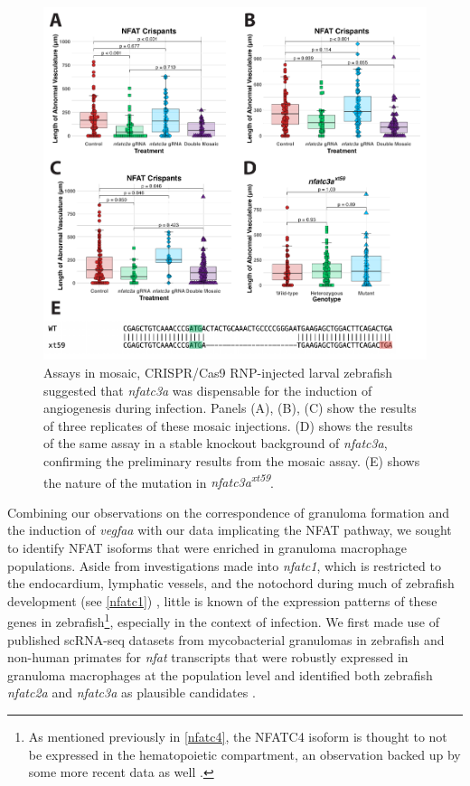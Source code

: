 \begin{figure}
\centering
\includegraphics[width=\textwidth]{images/mosaicnfatc3a.pdf}
\caption{Assays in mosaic, CRISPR/Cas9 RNP-injected larval zebrafish suggested that \textit{nfatc3a} was dispensable for the induction of angiogenesis during infection. Panels (A), (B), (C) show the results of three replicates of these mosaic injections. (D) shows the results of the same assay in a stable knockout background of \textit{nfatc3a}, confirming the preliminary results from the mosaic assay. (E) shows the nature of the mutation in \textit{nfatc3a\textsuperscript{xt59}}.}
\label{figure:mosaic}
\end{figure}

Combining our observations on the correspondence of granuloma formation and the induction of \textit{vegfaa} with our data implicating the NFAT pathway, we sought to identify NFAT isoforms that were enriched in granuloma macrophage populations. Aside from investigations made into \textit{nfatc1}, which is restricted to the endocardium, lymphatic vessels, and the notochord during much of zebrafish development (see \autoref{nfatc1}) \citep{Pestel2016, Shin2019, Bagwell2020}, little is known of the expression patterns of these genes in zebrafish\footnote{As mentioned previously in \autoref{nfatc4}, the NFATC4 isoform is thought to not be expressed in the hematopoietic compartment, an observation backed up by some more recent data as well \citep{Peuker2022}.}, especially in the context of infection. We first made use of published scRNA-seq datasets from mycobacterial granulomas in zebrafish and non-human primates for \textit{nfat} transcripts that were robustly expressed in granuloma macrophages at the population level and identified both zebrafish \textit{nfatc2a} and \textit{nfatc3a} as plausible candidates \citep{Cronan2021, Gideon2022}.


